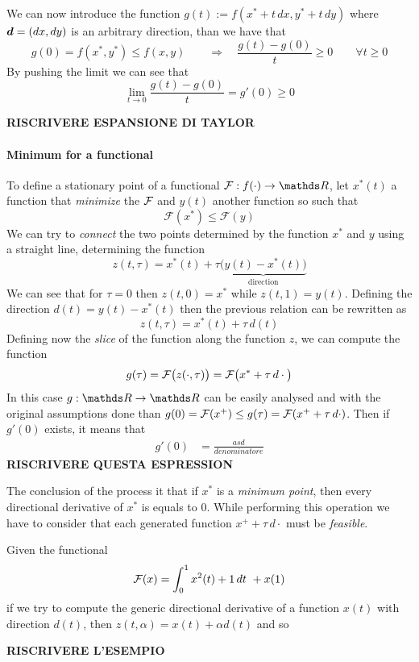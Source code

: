 	We can now introduce the function $g(t) := f(x^* + t\, dx, y^* + t\, dy)$ where $\boldsymbol{d} = (dx,dy)$ is an arbitrary direction, than we have that
	\[ g(0) = f(x^*,y^*)\leq f(x,y) \qquad \Rightarrow \quad \frac{g(t)-g(0)}{t} \geq 0 \qquad \forall t\geq 0\]
	By pushing the limit we can see that
	\[ \lim_{t\rightarrow 0}\frac{g(t)-g(0)}{t} = g'(0) \geq 0 \]
	
	\textbf{RISCRIVERE ESPANSIONE DI TAYLOR}
	
	\paragraph{Minimum for a functional} To define a stationary point of a functional $\fun F: f(\cdot)\rightarrow \R$, let $x^*(t)$ a function that \textit{minimize} the $\mathcal{F}$ and $y(t)$ another function so such that
	\[ \mathcal F(x^*) \leq \mathcal F(y) \]
	We can try to \textit{connect} the two points determined by the function $x^*$ and $y$ using a straight line, determining the function
	\[ z(t,\tau) = x^*(t) + \tau\underbrace{\big(y(t)-x^*(t)\big)}_{\textrm{direction}} \]
	We can see that for $\tau = 0$ then $z(t,0)=x^*$ while $z(t,1) = y(t)$. Defining the direction $d(t) = y(t)-x^*(t)$ then the previous relation can be rewritten as
	\[ z(t,\tau) = x^*(t) + \tau \, d(t) \]
	Defining now the \textit{slice} of the function along the function $z$, we can compute the function
	\[ g(\tau) = \mathcal{F}\big(z(\cdot,\tau)\big) = \mathcal{F}\big(x^* + \tau \, d\cdot\big) \]
	In this case $g:\R\rightarrow \R$ can be easily analysed and with the original assumptions done than $g(0) = \mathcal F(x^+) \leq g(\tau) = \mathcal{F}(x^++ \tau \, d\cdot)$. Then if $g'(0)$ exists, it means that
	\begin{align*}
		g'(0) & =\frac{asd}{denominatore}
	\end{align*}
	\textbf{RISCRIVERE QUESTA ESPRESSION}
	
	The conclusion of the process it that if $x^*$ is a \textit{minimum point}, then every directional derivative of $x^*$ is equals to 0. While performing this operation we have to consider that each  generated function $x^++\tau\, d\cdot$ must be \textit{feasible}.
	
	
	\begin{example}{}
		Given the functional
		\[ \mathcal{F}(x) = \int_0^1 x^2(t) + 1 \, dt  \ + x(1) \]
		if we try to compute the generic directional derivative of a function $x(t)$ with direction $d(t)$, then $z(t,\alpha) = x(t) + \alpha d(t)$ and so 
		
		\textbf{RISCRIVERE L'ESEMPIO} 
	\end{example}
	

